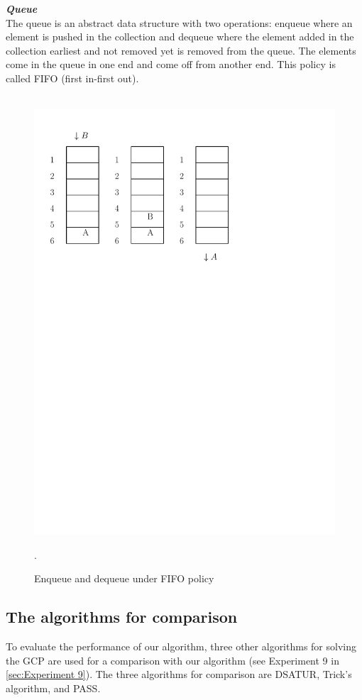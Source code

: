 \documentclass[12pt,a4paper,twoside]{scrartcl}
\numberwithin{equation}{section}
\begin{document}
\emph{\textbf{Queue}}\\
The queue is an abstract data structure with two operations: enqueue where an element is pushed in the collection and dequeue where the element added in the collection earliest and not removed yet is removed from the queue.
The elements come in the queue in one end and come off from another end. This policy is called FIFO (first in-first out).
\begin{figure}[h!]
\centering
 \hbox{\hspace{12em} \includegraphics[scale = 0.6]{1/queue.pdf}}
 \caption{Enqueue and dequeue under FIFO policy}.
\end{figure}

\subsection{The algorithms for comparison}
\label{comparison}
To evaluate the performance of our algorithm, three other algorithms for solving the GCP are used for a comparison with our algorithm (see Experiment 9 in \ref{sec:Experiment 9}). The three algorithms for comparison are DSATUR, Trick's algorithm, and PASS.\\
\end{document}
